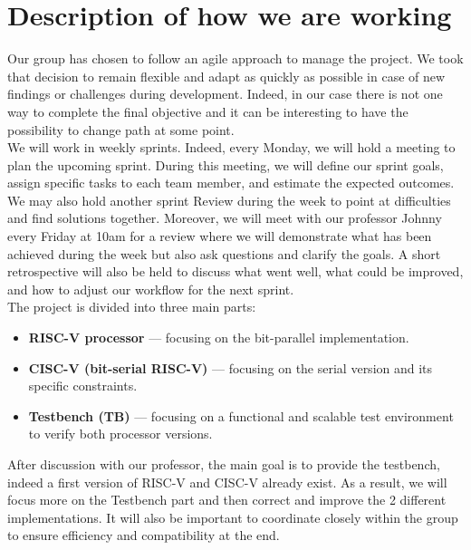 \documentclass[10pt,twocolumn]{article}
\begin{document}
\section{Description of how we are working}
Our group has chosen to follow an agile approach to manage the project. We took that decision to remain flexible and adapt as quickly as possible in case of new findings or challenges during development. Indeed, in our case there is not one way to complete the final objective and it can be interesting to have the possibility to change path at some point.\\
We will work in weekly sprints. Indeed, every Monday, we will hold a meeting to plan the upcoming sprint. During this meeting, we will define our sprint goals, assign specific tasks to each team member, and estimate the expected outcomes.
We may also hold another sprint Review during the week to point at difficulties and find solutions together.
Moreover, we will meet with our professor Johnny every Friday at 10am for a review where we will demonstrate what has been achieved during the week but also ask questions and clarify the goals.
A short retrospective will also be held to discuss what went well, what could be improved, and how to adjust our workflow for the next sprint.\\
The project is divided into three main parts:

\begin{itemize}
  \item \textbf{RISC-V processor} — focusing on the bit-parallel implementation.
  \item \textbf{CISC-V (bit-serial RISC-V)} — focusing on the serial version and its specific constraints.
  \item \textbf{Testbench (TB)} — focusing on a functional and scalable test environment to verify both processor versions.
\end{itemize}
After discussion with our professor, the main goal is to provide the testbench, indeed a first version of RISC-V and CISC-V already exist. As a result, we will focus more on the Testbench part and then correct and improve the 2 different implementations. It will also be important to coordinate closely within the group to ensure efficiency and compatibility at the end.
\end{document}
